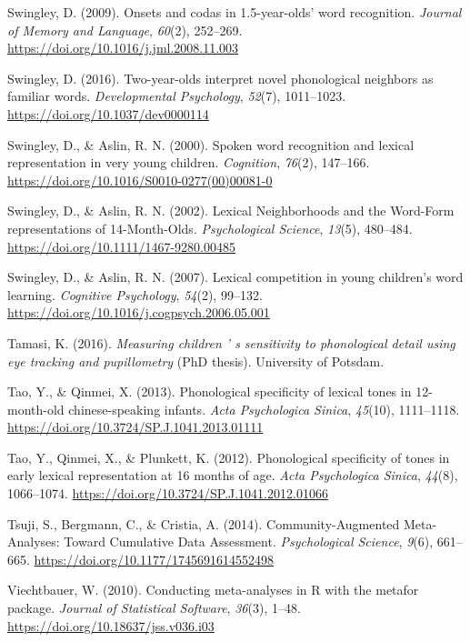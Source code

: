 \documentclass[
  english,
  man, noextraspace]{apa6}
\newlength{\cslhangindent}
\newenvironment{cslreferences}%
  {\setlength{\parindent}{0pt}%
  \everypar{\setlength{\hangindent}{\cslhangindent}}\ignorespaces}%
  {\par}
\begin{document}
\begin{cslreferences}
\leavevmode\hypertarget{ref-Swingley2009}{}%
Swingley, D. (2009). Onsets and codas in 1.5-year-olds' word recognition. \emph{Journal of Memory and Language}, \emph{60}(2), 252--269. \url{https://doi.org/10.1016/j.jml.2008.11.003}

\leavevmode\hypertarget{ref-Swingley2016}{}%
Swingley, D. (2016). Two-year-olds interpret novel phonological neighbors as familiar words. \emph{Developmental Psychology}, \emph{52}(7), 1011--1023. \url{https://doi.org/10.1037/dev0000114}

\leavevmode\hypertarget{ref-Swingley2000}{}%
Swingley, D., \& Aslin, R. N. (2000). Spoken word recognition and lexical representation in very young children. \emph{Cognition}, \emph{76}(2), 147--166. \url{https://doi.org/10.1016/S0010-0277(00)00081-0}

\leavevmode\hypertarget{ref-Swingley2002}{}%
Swingley, D., \& Aslin, R. N. (2002). Lexical Neighborhoods and the Word-Form representations of 14-Month-Olds. \emph{Psychological Science}, \emph{13}(5), 480--484. \url{https://doi.org/10.1111/1467-9280.00485}

\leavevmode\hypertarget{ref-Swingley2007}{}%
Swingley, D., \& Aslin, R. N. (2007). Lexical competition in young children's word learning. \emph{Cognitive Psychology}, \emph{54}(2), 99--132. \url{https://doi.org/10.1016/j.cogpsych.2006.05.001}

\leavevmode\hypertarget{ref-Tamasi2016}{}%
Tamasi, K. (2016). \emph{Measuring children ' s sensitivity to phonological detail using eye tracking and pupillometry} (PhD thesis). University of Potsdam.

\leavevmode\hypertarget{ref-Tao2013}{}%
Tao, Y., \& Qinmei, X. (2013). Phonological specificity of lexical tones in 12-month-old chinese-speaking infants. \emph{Acta Psychologica Sinica}, \emph{45}(10), 1111--1118. \url{https://doi.org/10.3724/SP.J.1041.2013.01111}

\leavevmode\hypertarget{ref-Tao2012}{}%
Tao, Y., Qinmei, X., \& Plunkett, K. (2012). Phonological specificity of tones in early lexical representation at 16 months of age. \emph{Acta Psychologica Sinica}, \emph{44}(8), 1066--1074. \url{https://doi.org/10.3724/SP.J.1041.2012.01066}

\leavevmode\hypertarget{ref-Tsuji2014}{}%
Tsuji, S., Bergmann, C., \& Cristia, A. (2014). Community-Augmented Meta-Analyses: Toward Cumulative Data Assessment. \emph{Psychological Science}, \emph{9}(6), 661--665. \url{https://doi.org/10.1177/1745691614552498}

\leavevmode\hypertarget{ref-metafor}{}%
Viechtbauer, W. (2010). Conducting meta-analyses in R with the metafor package. \emph{Journal of Statistical Software}, \emph{36}(3), 1--48. \url{https://doi.org/10.18637/jss.v036.i03}


\end{cslreferences}
\end{document}
